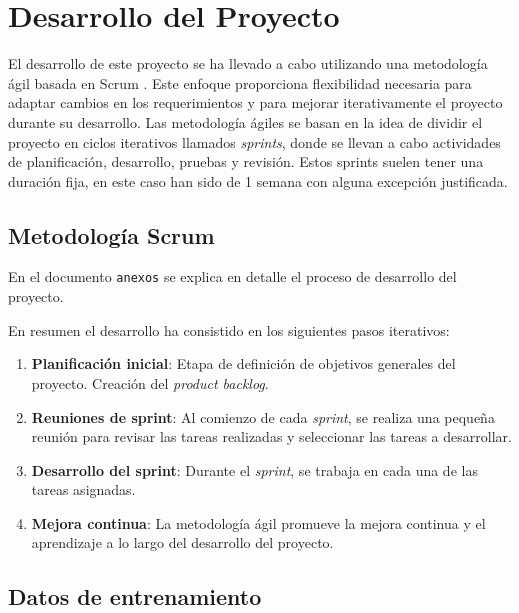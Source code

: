 
\section{Desarrollo del Proyecto}

El desarrollo de este proyecto se ha llevado a cabo utilizando una metodología ágil basada en Scrum \cite{Scrum}. Este enfoque proporciona flexibilidad necesaria para adaptar cambios en los requerimientos y para mejorar iterativamente el proyecto durante su desarrollo.
Las metodología ágiles se basan en la idea de dividir el proyecto en ciclos iterativos llamados \textit{sprints}, donde se llevan a cabo actividades de planificación, desarrollo, pruebas y revisión. 
Estos sprints suelen tener una duración fija, en este caso han sido de 1 semana con alguna excepción justificada.

\subsection{Metodología Scrum}
En el documento \texttt{anexos} se explica en detalle el proceso de desarrollo del proyecto.

En resumen el desarrollo ha consistido en los siguientes pasos iterativos:

\begin{enumerate}
\item \textbf{Planificación inicial}: Etapa de definición de objetivos generales del proyecto. Creación del \textit{product backlog}.

\item \textbf{Reuniones de sprint}: Al comienzo de cada \textit{sprint}, se realiza una pequeña reunión para revisar las tareas realizadas y seleccionar las tareas a desarrollar.

\item \textbf{Desarrollo del sprint}: Durante el \textit{sprint}, se trabaja en cada una de las tareas asignadas.

\item \textbf{Mejora continua}: La metodología ágil promueve la mejora continua y el aprendizaje a lo largo del desarrollo del proyecto.
\end{enumerate}

\subsection{Datos de entrenamiento}

